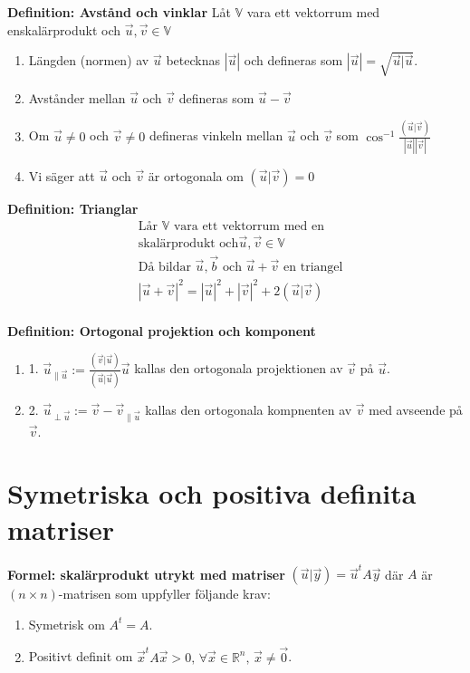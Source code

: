 \begin{multicols}{2}
\textbf{Definition: Avstånd och vinklar}
Låt $\mathbb{V}$ vara ett vektorrum med enskalärprodukt och $\vec{u},\vec{v}\in\mathbb{V}$
\begin{enumerate}
  \item Längden (normen) av $\vec{u}$ betecknas $|\vec{u}|$ och defineras som $|\vec{u}|=\sqrt{\vec{u}|\vec{u}}$.
  \item Avstånder mellan $\vec{u}$ och $\vec{v}$ defineras som $\vec{u}-\vec{v}$
  \item Om $\vec{u}\neq{0}$ och $\vec{v}\neq{0}$ defineras vinkeln mellan
    $\vec{u}$ och $\vec{v}$ som
    $\cos^{-1}\frac{(\vec{u}|\vec{v})}{|\vec{u}||\vec{v}|}$
  \item Vi säger att $\vec{u}$ och $\vec{v}$ är ortogonala om
    $(\vec{u}|\vec{v})=0$
\end{enumerate}

\textbf{Definition: Trianglar}
\begin{align*}
  &\text{Lår $\mathbb{V}$ vara ett vektorrum med en} \\
  &\text{skalärprodukt och} \vec{u},\vec{v}\in\mathbb{V} \\
  &\text{Då bildar $\vec{u},\vec{b}$ och $\vec{u}+\vec{v}$ en triangel} \\
  &{|\vec{u}+\vec{v}|}^2 = {|\vec{u}|}^2 + {|\vec{v}|}^2 + 2(\vec{u}|\vec{v}) \\
\end{align*}

\textbf{Definition: Ortogonal projektion och komponent}
\begin{enumerate}
  \item 1. $\vec{u}_{\|\vec{u}} := \frac{(\vec{v}|\vec{u})}{(\vec{u}|\vec{u})}\vec{u}$
    kallas den ortogonala projektionen av $\vec{v}$ på $\vec{u}$.
  \item 2. $\vec{u}_{\perp{\vec{u}}} := \vec{v} - \vec{v}_{\|\vec{u}}$
    kallas den ortogonala kompnenten av $\vec{v}$ med avseende på $\vec{v}$.
\end{enumerate}


\section{Symetriska och positiva definita matriser}
\textbf{Formel: skalärprodukt utrykt med matriser}
$(\vec{u}|\vec{y}) = \vec{u}^t A \vec{y}$
där $A$ är $(n \times n)$-matrisen som uppfyller följande krav:
\begin{enumerate}
  \item Symetrisk om $A^t=A$.
  \item Positivt definit om $\vec{x}^t A \vec{x} > 0, \, \forall \vec{x}\in\mathbb{R}^n, \, \vec{x}\neq \vec{0}$.
\end{enumerate}


\end{multicols}
